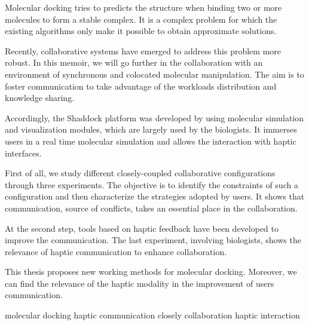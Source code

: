 \documentclass[myfrancais,ngerman,english,french]{mythesis}
\begin{document}
	\begin{myabstract}[english]
		Molecular docking tries to predicts the structure when binding two or more molecules to form a stable complex.
		It is a complex problem for which the existing algorithms only make it possible to obtain approximate solutions.

		Recently, collaborative systems have emerged to address this problem more robust.
		In this memoir, we will go further in the collaboration with an environment of synchronous and colocated molecular manipulation.
		The aim is to foster communication to take advantage of the workloads distribution and knowledge sharing.

		Accordingly, the Shaddock platform was developed by using molecular simulation and visualization modules, which are largely used by the biologists.
		It immerses users in a real time molecular simulation and allows the interaction with haptic interfaces.

		First of all, we study different closely-coupled collaborative configurations through three experiments.
		The objective is to identify the constraints of such a configuration and then characterize the strategies adopted by users.
		It shows that communication, source of conflicts, takes an essential place in the collaboration.

		At the second step, tools based on haptic feedback have been developed to improve the communication.
		The last experiment, involving biologists, shows the relevance of haptic communication to enhance collaboration.

		This thesis proposes new working methods for molecular docking.
		Moreover, we can find the relevance of the haptic modality in the improvement of users communication.
		\begin{mykeywords}
			\mykeyword molecular docking
			\mykeyword haptic communication
			\mykeyword closely collaboration
			\mykeyword haptic interaction
		\end{mykeywords}
	\end{myabstract}
	\mainmatter
\end{document}
